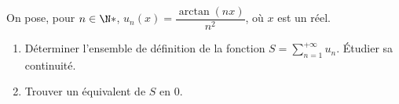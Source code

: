 \begin{enonce}
\begin{exercise}[ID={RMS127 E736},subtitle={Mines-Ponts PSI 2016},tags={}, difficulty={0}]
  On pose, pour $n\in\N*$, $u_n(x)=\dfrac{\arctan(nx)}{n^2}$, où $x$ est un réel.
  \begin{enumerate}
    \item 
      Déterminer l'ensemble de définition de la fonction $S=\sum\limits_{n=1}^{+\infty} u_n$.
      Étudier sa continuité.

    \item
      Trouver un équivalent de $S$ en $0$.
  \end{enumerate}
\end{exercise}
\begin{solution}
\end{solution}
\end{enonce}
